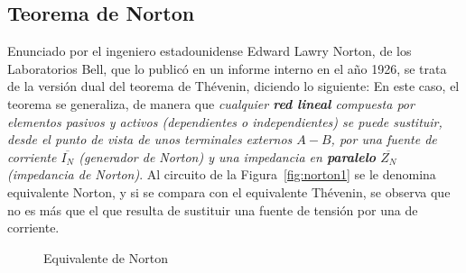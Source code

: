      
\subsection{Teorema de Norton}
Enunciado por el ingeniero estadounidense Edward Lawry Norton, de los
Laboratorios Bell, que lo publicó en un informe interno en el año
1926, se trata de la versión dual del teorema de Thévenin, diciendo lo
siguiente: En este caso, el teorema se generaliza, de manera que
\textit{cualquier \textbf{red lineal} compuesta por elementos pasivos
  y activos (dependientes o independientes) se puede sustituir, desde
  el punto de vista de unos terminales externos $A-B$, por una fuente
  de corriente $\overline{I_{N}}$ (generador de Norton) y una
  impedancia en \textbf{paralelo} $\overline{Z_{N}}$ (impedancia de
  Norton)}. Al circuito de la Figura~\ref{fig:norton1} se le denomina
equivalente Norton, y si se compara con el equivalente Thévenin, se
observa que no es más que el que resulta de sustituir una fuente de
tensión por una de corriente.
\begin{figure}[H]
  \centering {}\hfil
  \caption{Equivalente de Norton}
\end{figure}

